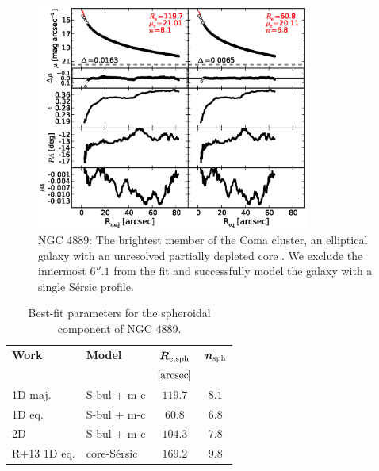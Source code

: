 \documentclass[preprint2]{emulateapj}
\newcommand{\fitfigurewidth}{0.8\textwidth}
\begin{document}
  \begin{figure}[h]
  \begin{center}
  \includegraphics[width=\fitfigurewidth]{images/n4889_1Dfit.eps}
  \caption{NGC 4889: 
  The brightest member of the Coma cluster, 
  an elliptical galaxy with an unresolved partially depleted core \citep{rusli2013}. %
  We exclude the innermost $6''.1$ from the fit and
  successfully model the galaxy with a single S\'ersic profile.
  }
  \end{center}
  \end{figure}

  \begin{table}[h]
  \small
  \caption{Best-fit parameters for the spheroidal component of NGC 4889.}
  \begin{center}
  \begin{tabular}{llcc}
  \hline
  {\bf Work} & {\bf Model}   & $\bm R_{\rm e,sph}$    & $\bm n_{\rm sph}$ \\
    &  &  $[\rm arcsec]$ & \\
  \hline
  1D maj. & S-bul + m-c & $119.7$  &  $8.1$ \\
  1D eq.  & S-bul + m-c & $60.8$	&  $6.8$ \\
  2D      & S-bul + m-c & $104.3$  &  $7.8$ \\
  \hline
  R+13 1D eq.         & core-S\'ersic & $169.2$  &  $9.8$ \\
  \hline
  \end{tabular}
  \end{center}
  \label{tab:n4889}
  \end{table}
    
\end{document}

